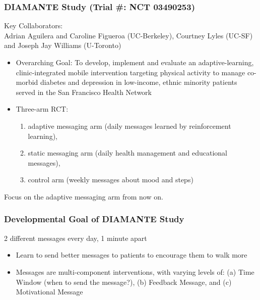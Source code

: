 \documentclass[10pt,xcolor=dvipsnames]{beamer}
\begin{document}
\begin{frame}
\frametitle{DIAMANTE Study (Trial \#: NCT 03490253)}
Key Collaborators:\\ 
{\color{blue}Adrian Aguilera} and {\color{blue}Caroline Figueroa} (UC-Berkeley), {\color{blue}Courtney Lyles} (UC-SF) and {\color{blue}Joseph Jay Williams} (U-Toronto)
\bigskip
\begin{itemize}
\item \alert{Overarching Goal:} To develop, implement and evaluate an \alert{adaptive-learning}, clinic-integrated mobile intervention targeting {\color{blue}physical activity to manage co-morbid diabetes and depression} in low-income, ethnic minority patients served in the San Francisco Health Network
\bigskip
\item Three-arm RCT: 
\begin{enumerate}
\item \alert{adaptive messaging arm} (daily messages learned by \alert{reinforcement learning}), 
\item static messaging arm (daily health management and educational messages), 
\item control arm (weekly messages about mood and steps)
\end{enumerate}
\end{itemize}
\begin{center}
\alert{Focus on the adaptive messaging arm from now on.}
\end{center}
\end{frame}




\begin{frame}[plain]
\frametitle{Developmental Goal of DIAMANTE Study}
\begin{block}{2 different messages every day, 1 minute apart}
\begin{figure}
\end{figure}
\end{block}
\begin{itemize}
\item Learn to send better messages to patients to encourage them to walk more %
\bigskip
\item Messages are \alert{multi-component interventions, with varying levels} of: (a) Time Window (when to send the message?), (b) Feedback Message, and (c) Motivational Message
\end{itemize}
\end{frame}
\end{document}

